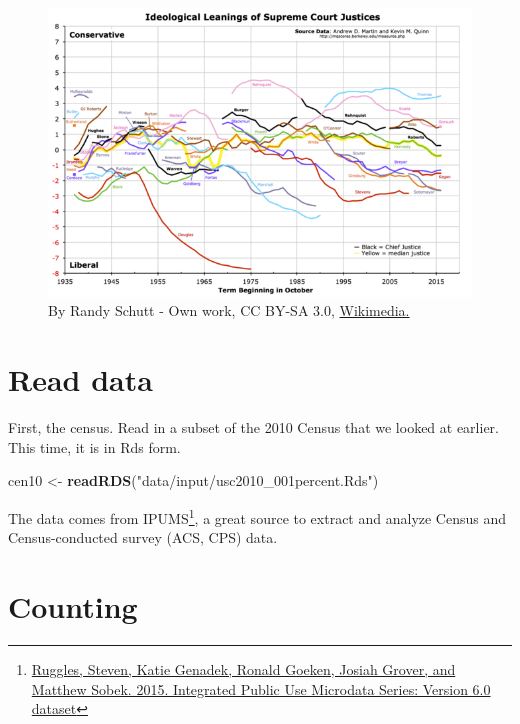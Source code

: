 \documentclass[
]{book}
\newenvironment{Shaded}{\begin{snugshade}}{\end{snugshade}}
\newcommand{\KeywordTok}[1]{\textcolor[rgb]{0.13,0.29,0.53}{\textbf{#1}}}
\newcommand{\NormalTok}[1]{#1}
\newcommand{\StringTok}[1]{\textcolor[rgb]{0.31,0.60,0.02}{#1}}
\theoremstyle{definition}
\theoremstyle{definition}
\theoremstyle{definition}
\theoremstyle{remark}
\begin{document}
\begin{figure}
\centering
\includegraphics{images/Martin-Quinn_Wikipedia.png}
\caption{By Randy Schutt - Own work, CC BY-SA 3.0, \href{https://commons.wikimedia.org/w/index.php?curid=29585342}{Wikimedia.}}
\end{figure}

\hypertarget{read-data-2}{%
\section{Read data}\label{read-data-2}}

First, the census. Read in a subset of the 2010 Census that we looked at earlier. This time, it is in Rds form.

\begin{Shaded}
\begin{Highlighting}[]
\NormalTok{cen10 <{-}}\StringTok{ }\KeywordTok{readRDS}\NormalTok{(}\StringTok{"data/input/usc2010\_001percent.Rds"}\NormalTok{)}
\end{Highlighting}
\end{Shaded}

The data comes from IPUMS\footnote{\href{http://doi.org/10.18128/D010.V6.0}{Ruggles, Steven, Katie Genadek, Ronald Goeken, Josiah Grover, and Matthew Sobek. 2015. Integrated Public Use Microdata Series: Version 6.0 dataset}}, a great source to extract and analyze Census and Census-conducted survey (ACS, CPS) data.

\hypertarget{counting}{%
\section{Counting}\label{counting}}
\end{document}
